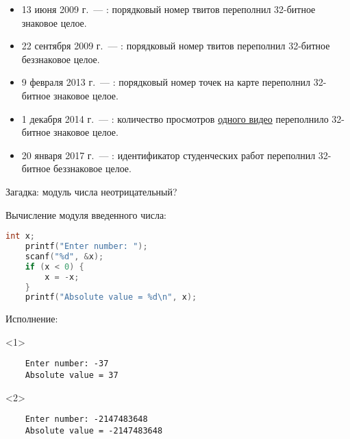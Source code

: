 \begin{frame}{}

  \begin{itemize}
    \pause
    \item 13 июня 2009 г.~--- : порядковый номер твитов
      переполнил 32-битное знаковое целое.
    \pause
    \item 22 сентября 2009 г.~--- : порядковый номер твитов
      переполнил 32-битное беззнаковое целое.
    \pause
    \item 9 февраля 2013 г.~--- : порядковый номер точек на
      карте переполнил 32-битное знаковое целое.
    \pause
    \item 1 декабря 2014 г.~--- : количество просмотров
      \href{https://www.youtube.com/watch?v=9bZkp7q19f0}{одного видео}
      переполнило 32-битное знаковое целое.
    \pause
    \item 20 января 2017 г.~--- : идентификатор студенческих
      работ переполнил 32-битное беззнаковое целое.
  \end{itemize}


\end{frame}

\begin{frame}[fragile]{Загадка: модуль числа неотрицательный?}

  \begin{block}{Вычисление модуля введенного числа:}
    \begin{lstlisting}[language=C]
    int x;
    printf("Enter number: ");
    scanf("%d", &x);
    if (x < 0) {
        x = -x;
    }
    printf("Absolute value = %d\n", x);
    \end{lstlisting}
  \end{block}

  \begin{block}{Исполнение:}
    \begin{onlyenv}<1>\begin{lstlisting}
    Enter number: -37
    Absolute value = 37
    \end{lstlisting}\end{onlyenv}
    \begin{onlyenv}<2>\begin{lstlisting}
    Enter number: -2147483648
    Absolute value = -2147483648
    \end{lstlisting}\end{onlyenv}
  \end{block}

\end{frame}


